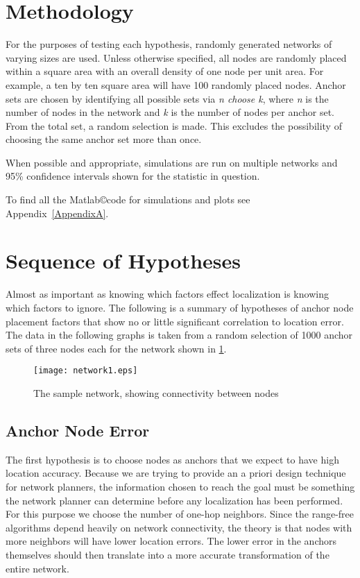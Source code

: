 \section{Methodology}
For the purposes of testing each hypothesis, randomly generated networks of varying sizes are used.  Unless otherwise specified, all nodes are randomly placed within a square area with an overall density of one node per unit area.  For example, a ten by ten square area will have 100 randomly placed nodes.  Anchor sets are chosen by identifying all possible sets via \emph{n choose k}, where \emph{n} is the number of nodes in the network and \emph{k} is the number of nodes per anchor set.  From the total set, a random selection is made.  This excludes the possibility of choosing the same anchor set more than once.

When possible and appropriate, simulations are run on multiple networks and 95\% confidence intervals shown for the statistic in question.  

To find all the Matlab\copyright code for simulations and plots see Appendix~\ref{AppendixA}.

\section{Sequence of Hypotheses}
Almost as important as knowing which factors effect localization is knowing which factors to ignore.
The following is a summary of hypotheses of anchor node placement factors that show no or little significant correlation to location error.  The data in the following graphs is taken from a random selection of 1000 anchor sets of three nodes each for the network shown in \ref{fig:HypothesesNetwork}.

\begin{figure}
	\centering
		\texttt{[image: network1.eps]}
	\label{fig:HypothesesNetwork}
	\caption{The sample network, showing connectivity between nodes}
\end{figure}

\subsection{Anchor Node Error}
The first hypothesis is to choose nodes as anchors that we expect to have high location accuracy. Because we are trying to provide an a priori design technique for network planners, the information chosen to reach the goal must be something the network planner can determine before any localization has been performed.  For this purpose we choose the number of one-hop neighbors.  Since the range-free algorithms depend heavily on network connectivity, the theory is that nodes with more neighbors will have lower location errors.  The lower error in the anchors themselves should then translate into a more accurate transformation of the entire network.

